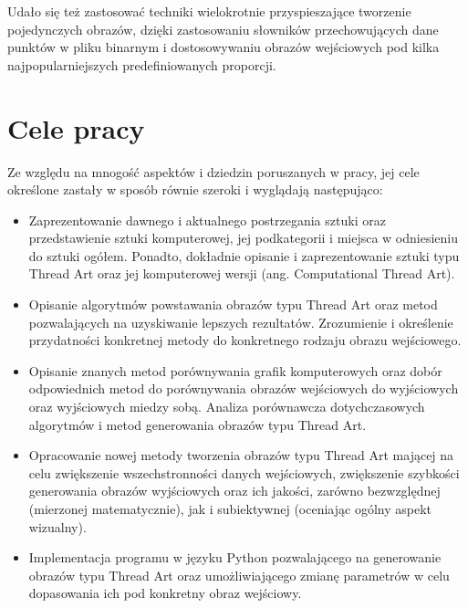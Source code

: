     Udało się też zastosować techniki wielokrotnie przyspieszające tworzenie pojedynczych obrazów, dzięki zastosowaniu słowników przechowujących dane punktów w pliku binarnym i dostosowywaniu obrazów wejściowych pod kilka najpopularniejszych predefiniowanych proporcji.  
    
    \section{Cele pracy} \label{intro-goals}
    Ze względu na mnogość aspektów i dziedzin poruszanych w pracy, jej cele określone zastały w sposób równie szeroki i wyglądają następująco: 
    \begin{itemize}
        \item Zaprezentowanie dawnego i aktualnego postrzegania sztuki oraz przedstawienie sztuki komputerowej, jej podkategorii i miejsca w odniesieniu do sztuki ogółem. Ponadto, dokładnie opisanie i zaprezentowanie sztuki typu Thread Art oraz jej komputerowej wersji (ang. Computational Thread Art).
        \item Opisanie algorytmów powstawania obrazów typu Thread Art oraz metod pozwalających na uzyskiwanie lepszych rezultatów. Zrozumienie i określenie przydatności konkretnej metody do konkretnego rodzaju obrazu wejściowego.
        \item Opisanie znanych metod porównywania grafik komputerowych oraz dobór odpowiednich metod do porównywania obrazów wejściowych do wyjściowych oraz wyjściowych miedzy sobą. Analiza porównawcza dotychczasowych algorytmów i metod generowania obrazów typu Thread Art.
        \item Opracowanie nowej metody tworzenia obrazów typu Thread Art mającej na celu zwiększenie wszechstronności danych wejściowych, zwiększenie szybkości generowania obrazów wyjściowych oraz ich jakości, zarówno bezwzględnej (mierzonej matematycznie), jak i subiektywnej (oceniając ogólny aspekt wizualny).
        \item Implementacja programu w języku Python pozwalającego na generowanie obrazów typu Thread Art oraz umożliwiającego zmianę parametrów w celu dopasowania ich pod konkretny obraz wejściowy.
    \end{itemize}

